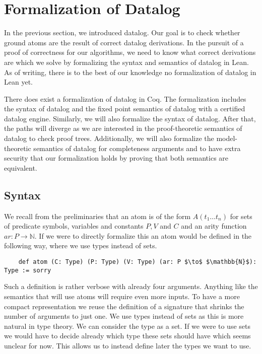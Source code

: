 \section{Formalization of Datalog}\label{sec:formDatalog}
In the previous section, we introduced datalog. Our goal is to check whether ground atoms are the result of correct datalog derivations. In the pursuit of a proof of correctness for our algorithms, we need to know what correct derivations are which we solve by formalizing the syntax and semantics of datalog in Lean. As of writing, there is to the best of our knowledge no formalization of datalog in Lean yet. 

There does exist a formalization of datalog in Coq\cite{datalogCoq}. The formalization includes the syntax of datalog and the fixed point semantics of datalog with a certified datalog engine. Similarly, we will also formalize the syntax of datalog. After that, the paths will diverge as we are interested in the proof-theoretic semantics of datalog to check proof trees. Additionally, we will also formalize the model-theoretic semantics of datalog for completeness arguments and to have extra security that our formalization holds by proving that both semantics are equivalent.

\subsection{Syntax}

We recall from the preliminaries that an atom is of the form $A(t_1 \dots t_n)$ for sets of predicate symbols, variables and constants $P, V$ and $C$ and an arity function $ar: P \to \mathbb{N}$. If we were to directly formalize this an atom would be defined in the following way, where we use types instead of sets.

\begin{lstlisting}
    def atom (C: Type) (P: Type) (V: Type) (ar: P $\to$ $\mathbb{N}$): Type := sorry
\end{lstlisting}

Such a definition is rather verbose with already four arguments. Anything like the semantics that will use atoms will require even more inputs. To have a more compact representation we reuse the definition of a signature that shrinks the number of arguments to just one.  We use types instead of sets as this is more natural in type theory. We can consider the type as a set. If we were to use sets we would have to decide already which type these sets should have which seems unclear for now. This allows us to instead define later the types we want to use. 

